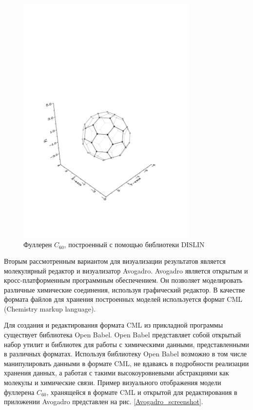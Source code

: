 \begin{figure}[ht!]
\centering
  \includegraphics[trim=30 120 30 330, clip, width=0.8\textwidth]{./FIGs/DISLIN_fullerene.pdf}
\caption{Фуллерен $C_{60}$, построенный с помощью библиотеки DISLIN}
\label{DISLIN_picture}
\end{figure}

Вторым рассмотренным вариантом для визуализации результатов является молекулярный
редактор и визуализатор Avogadro. Avogadro является открытым и кросс-платформенным
программным обеспечением. Он позволяет моделировать различные химические
соединения, используя графический редактор. В качестве формата файлов для хранения
построенных моделей используется формат CML (Chemistry markup language).

Для создания и редактирования формата CML из прикладной программы существует библиотека
Open Babel. Open Babel представляет собой открытый набор утилит и библиотек для работы с
химическими данными, представленными в различных форматах. Используя библиотеку Open Babel
возможно в том числе манипулировать данными в формате CML, не вдаваясь в подробности
реализации хранения данных, а работая с такими высокоуровневыми абстракциями как молекулы и
химические связи. Пример визуального отображения модели фуллерена $C_{60}$, хранящейся в формате
CML и открытой для редактирования в приложении Avogadro представлен на рис. \ref{Avogadro_screenshot}.

